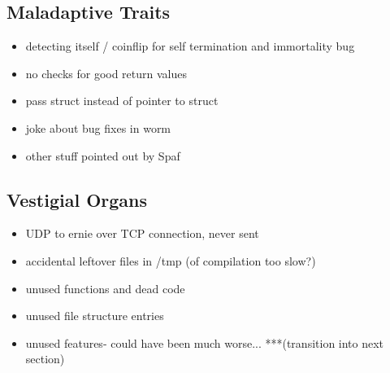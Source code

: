 \subsection*{Maladaptive Traits}
    	\begin{itemize}
 	    \item detecting itself / coinflip for self termination and immortality bug
        \item no checks for good return values
        \item pass struct instead of pointer to struct
        \item joke about bug fixes in worm
        \item other stuff pointed out by Spaf
        \end{itemize}

\subsection*{Vestigial Organs}
    	\begin{itemize}
        \item UDP to ernie over TCP connection, never sent
        \item accidental leftover files in /tmp (of compilation too slow?)
        \item unused functions and dead code
        \item unused file structure entries
    	\item unused features- could have been much worse... ***(transition into
    next section)
        \end{itemize}

